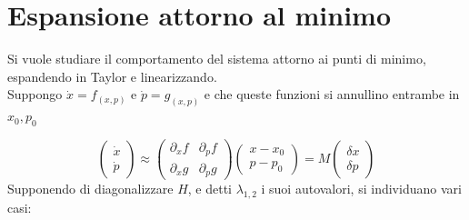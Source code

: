\documentclass[a4paper,12pt]{article}
\renewcommand{\arg}[1]{_{(#1)}}
\theoremstyle{plain}
\theoremstyle{definition}
\theoremstyle{remark}
\begin{document}
\section{Espansione attorno al minimo}
\label{expand1}
Si vuole studiare il comportamento del sistema attorno ai punti di minimo, espandendo in Taylor e linearizzando.\\Suppongo $\dot{x}=f\arg{x,p}$ e $\dot{p}=g\arg{x,p}$ e che queste funzioni si annullino entrambe in $x_0,p_0$

\[\begin{pmatrix}
\dot{x} \\ 
\dot{p}
\end{pmatrix} \approx\begin{pmatrix}
\partial_x f & \partial_p f \\ 
\partial_x g & \partial_p g
\end{pmatrix} 	\begin{pmatrix}
x-x_0 \\ 
p-p_0
\end{pmatrix}=M\begin{pmatrix}
\delta x \\ 
\delta p
\end{pmatrix} 	\]
Supponendo di diagonalizzare $H$, e detti $\lambda_{1,2}$ i suoi autovalori, si individuano vari casi:
\end{document}
